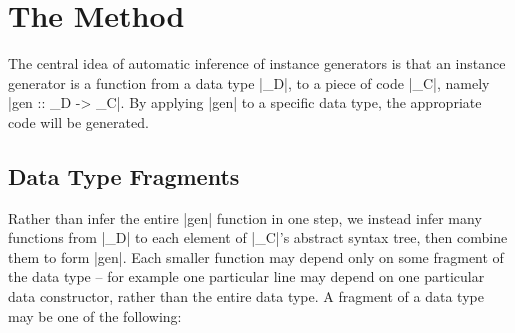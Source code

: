 \documentclass{llncs}
\begin{document}
\begin{comment}
\subsection{The Derive tool}

The Derive tool \cite{derive} is a competitor to DrIFT, designed to alleviate some of the disadvantages. The first advantage is that instance generators can added easily, without modifying the Derive tool. Secondly, by using the Template Haskell \cite{template_haskell} extension, no preprocessing phase is required. In order to integrate with Template Haskell, an instance generator takes a representation of a data type, and generates a Haskell syntax tree.

Writing an instance generator requires knowledge of the representation of both the data type, and the Haskell syntax tree. Unfortunately, the Haskell syntax tree is represented by a large data type, which takes time to learn. After writing an instance generator, the user must check that the generator matches their intention, by testing on a suitable range of data types. Both of these factors increase the time required to write an instance generator.

We have integrated automatic derivation of an instance generator, following the scheme in this paper, into the Derive tool. In order to specify a new instance generator, the user can \textit{either} specify a derivation function, \textit{or} have one automatically generated from an example.
\end{comment}

\section{The Method}
\label{sec:automatic_instances}

The central idea of automatic inference of instance generators is that an instance generator is a function from a data type |_D|, to a piece of code |_C|, namely |gen :: _D -> _C|. By applying |gen| to a specific data type, the appropriate code will be generated.

\subsection{Data Type Fragments}

Rather than infer the entire |gen| function in one step, we instead infer many functions from |_D| to each element of |_C|'s abstract syntax tree, then combine them to form |gen|. Each smaller function may depend only on some fragment of the data type -- for example one particular line may depend on one particular data constructor, rather than the entire data type. A fragment of a data type may be one of the following:
\end{document}
